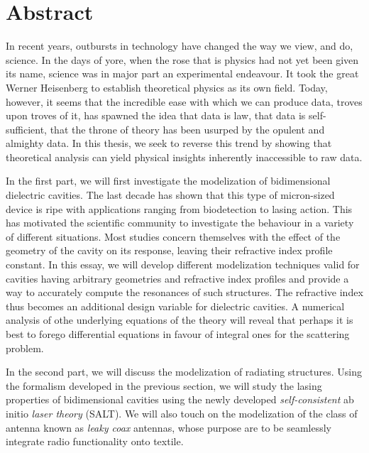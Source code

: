 \chapter*{Abstract}

In recent years, outbursts in technology have changed the way 
we view, and do, science. In the days of yore, when the rose
that is physics had not yet been given its name, science
was in major part an experimental endeavour. It took the great
Werner Heisenberg to establish theoretical physics as its own field. 
Today, however, it seems that the incredible ease with which we 
can produce data, troves upon troves of it, has spawned the idea
that data is law, that data is self-sufficient, that the throne of 
theory has been usurped by the opulent and almighty data. In this
thesis, we seek to reverse this trend by showing that theoretical 
analysis can yield physical insights inherently inaccessible to
raw data. 

In the first part, we will first investigate the modelization of bidimensional dielectric
cavities. The last decade has shown that this type of micron-sized device
is ripe with applications ranging from biodetection to lasing action. 
This has motivated the scientific community to investigate the behaviour in a
variety of different situations. Most studies concern themselves with the effect
of the geometry of the cavity on its response, leaving their refractive index
profile constant. In this essay, we will develop different modelization techniques valid 
for cavities having arbitrary geometries and refractive index profiles and provide
a way to accurately compute the resonances of such structures. The refractive
index thus becomes an additional design variable for dielectric cavities.
A numerical analysis of othe underlying equations of the theory will
reveal that perhaps it is best to forego differential equations 
in favour of integral ones for the scattering problem. 

In the second part, we will discuss the modelization of radiating structures. 
Using the formalism developed in the previous section, we will study the 
lasing properties of bidimensional cavities using the newly developed
\textit{self-consistent} ab initio \textit{laser theory} (SALT). We will also
touch on the modelization of the class of antenna known as \textit{leaky coax} antennas, 
whose purpose are to be seamlessly integrate radio functionality onto textile.